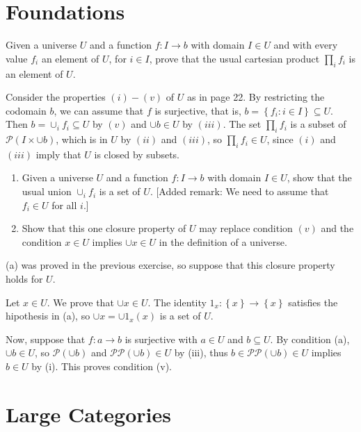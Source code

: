 \section{Foundations}

\begin{exercise}
Given a universe $U$ and a function $f:I\to b$ with domain $I\in U$ and with every value $f_i$ an element of $U$, for $i\in I$, prove that the usual cartesian product $\prod_i f_i$ is an element of $U$.
\end{exercise}
\begin{solution}
Consider the properties $(i)-(v)$ of $U$ as in page 22. By restricting the codomain $b$, we can assume that $f$ is surjective, that is, $b=\left\{f_i:i\in I\right\}\subseteq U$. Then $b=\cup_i f_i\subseteq U$ by $(v)$ and $\cup b\in U$ by $(iii)$. The set $\prod_i f_i$ is a subset of $\mathscr{P}(I\times \cup b)$, which is in $U$ by $(ii)$ and $(iii)$, so $\prod_i f_i\in U$, since $(i)$ and $(iii)$ imply that $U$ is closed by subsets.
\end{solution}

\begin{exercise}
\begin{enumerate}
\item[(a)] Given a universe $U$ and a function $f:I\to b$ with domain $I\in U$, show that the usual union $\cup_i f_i$ is a set of $U$. [Added remark: We need to assume that $f_i\in U$ for all $i$.]
\item[(b)] Show that this one closure property of $U$ may replace condition $(v)$ and the condition $x\in U$ implies $\cup x\in U$ in the definition of a universe.
\end{enumerate}
\end{exercise}
\begin{solution}
(a) was proved in the previous exercise, so suppose that this closure property holds for $U$.

Let $x\in U$. We prove that $\cup x\in U$. The identity $1_x:\left\{x\right\}\to\left\{x\right\}$ satisfies the hipothesis in (a), so $\cup x=\cup 1_x(x)$ is a set of $U$.

Now, suppose that $f:a\to b$ is surjective with $a\in U$ and $b\subseteq U$. By condition (a), $\cup b\in U$, so $\mathscr{P}(\cup b)$ and $\mathscr{P}\mathscr{P}(\cup b)\in U$ by (iii), thus $b\in\mathscr{P}\mathscr{P}(\cup b)\in U$ implies $b\in U$ by (i). This proves condition (v).
\end{solution}

\section{Large Categories}

